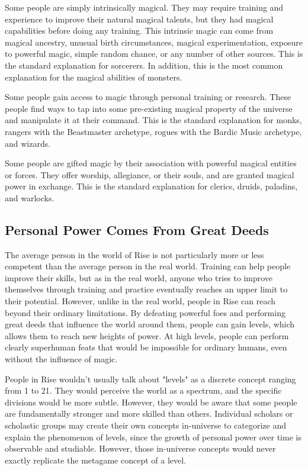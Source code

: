         Some people are simply intrinsically magical.
        They may require training and experience to improve their natural magical talents, but they had magical capabilities before doing any training.
        This intrinsic magic can come from magical ancestry, unusual birth circumstances, magical experimentation, exposure to powerful magic, simple random chance, or any number of other sources.
        This is the standard explanation for sorcerers.
        In addition, this is the most common explanation for the magical abilities of monsters.

        Some people gain access to magic through personal training or research.
        These people find ways to tap into some pre-existing magical property of the universe and manipulate it at their command.
        This is the standard explanation for monks, rangers with the Beastmaster archetype, rogues with the Bardic Music archetype, and wizards.

        Some people are gifted magic by their association with powerful magical entities or forces.
        They offer worship, allegiance, or their souls, and are granted magical power in exchange.
        This is the standard explanation for clerics, druids, paladins, and warlocks.

    \subsection{Personal Power Comes From Great Deeds}
        The average person in the world of Rise is not particularly more or less competent than the average person in the real world.
        Training can help people improve their skills, but as in the real world, anyone who tries to improve themselves through training and practice eventually reaches an upper limit to their potential.
        However, unlike in the real world, people in Rise can reach beyond their ordinary limitations.
        By defeating powerful foes and performing great deeds that influence the world around them, people can gain levels, which allows them to reach new heights of power.
        At high levels, people can perform clearly superhuman feats that would be impossible for ordinary humans, even without the influence of magic.

        People in Rise wouldn't usually talk about "levels" as a discrete concept ranging from 1 to 21.
        They would perceive the world as a spectrum, and the specific divisions would be more subtle.
        However, they would be aware that some people are fundamentally stronger and more skilled than others.
        Individual scholars or scholastic groups may create their own concepts in-universe to categorize and explain the phenomenon of levels, since the growth of personal power over time is observable and studiable. 
        However, those in-universe concepts would never exactly replicate the metagame concept of a level.

